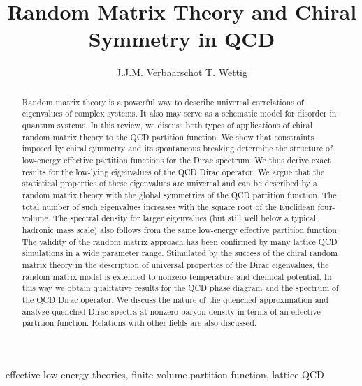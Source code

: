 \leftmargini\parindent

\def\openone{\leavevmode\hbox{\small1\kern-3.3pt\normalsize1}}
\def\Re{{\rm Re\:}}
\def\Im{{\rm Im\:}}
\def\Tr{{\rm Tr\:}}
\def\Str{{\rm Str\:}}
\def\diag{{\rm diag\:}}
\def\be{\begin{eqnarray}}
\def\ee{\end{eqnarray}}
\newcommand{\mat}{\left ( \begin{array}{cc}}
\newcommand{\emat}{\end{array} \right )}
\newcommand{\vect}{\left ( \begin{array}{c}}
\newcommand{\evect}{\end{array} \right )}
\title{Random Matrix Theory and Chiral Symmetry in QCD}

\author{J.J.M. Verbaarschot
T. Wettig
} 

\begin{keywords}
  effective low energy theories, finite volume partition function,
  lattice QCD
\end{keywords}

\begin{abstract}
  Random matrix theory is a powerful way to describe universal
  correlations of eigenvalues of complex systems. It also may
  serve as a schematic model for disorder in quantum systems. In this
  review, we discuss both types of applications of chiral random matrix
  theory to the QCD partition function. We show that constraints
  imposed by chiral symmetry and its spontaneous breaking determine
  the structure of low-energy effective partition functions for the
  Dirac spectrum. We thus derive exact results for the low-lying
  eigenvalues of the QCD Dirac operator.  We argue that the
  statistical properties of these eigenvalues are universal and can be
  described by a random matrix theory with the global symmetries of
  the QCD partition function.  The total number of such eigenvalues
  increases with the square root of the Euclidean four-volume. The
  spectral density for larger eigenvalues (but still well below a
  typical hadronic mass scale) also follows from the same low-energy
  effective partition function. The validity of the random matrix
  approach has been confirmed by many lattice QCD
  simulations in a wide parameter range.  Stimulated by the success of
  the chiral random matrix theory in the description of universal
  properties of the Dirac eigenvalues, the random matrix model is
  extended to nonzero temperature and chemical potential. In this way
  we obtain qualitative results for the QCD phase diagram and the
  spectrum of the QCD Dirac operator.  We discuss the nature of the
  quenched approximation and analyze quenched Dirac spectra at nonzero
  baryon density in terms of an effective partition function.
  Relations with other fields are also discussed.
\end{abstract}

